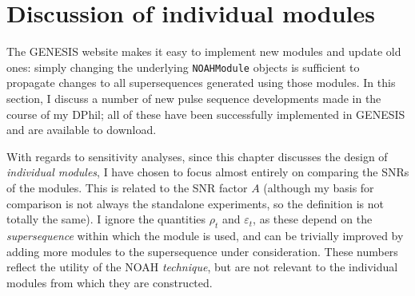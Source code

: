 \section{Discussion of individual modules}
\label{sec:noah__modules}

The GENESIS website makes it easy to implement new modules and update old ones: simply changing the underlying \texttt{NOAHModule} objects is sufficient to propagate changes to all supersequences generated using those modules.
In this section, I discuss a number of new pulse sequence developments made in the course of my DPhil; all of these have been successfully implemented in GENESIS and are available to download.

With regards to sensitivity analyses, since this chapter discusses the design of \textit{individual modules}, I have chosen to focus almost entirely on comparing the SNRs of the modules.
This is related to the SNR factor $A$ (although my basis for comparison is not always the standalone experiments, so the definition is not totally the same).
I ignore the quantities $\rho_t$ and $\varepsilon_t$, as these depend on the \textit{supersequence} within which the module is used, and can be trivially improved by adding more modules to the supersequence under consideration.
These numbers reflect the utility of the NOAH \textit{technique}, but are not relevant to the individual modules from which they are constructed.










